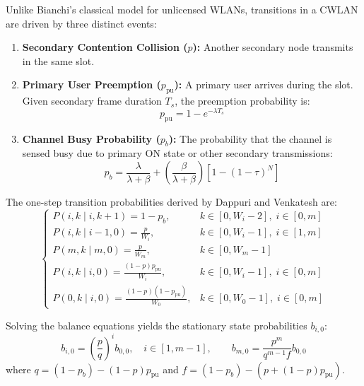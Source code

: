 Unlike Bianchi's classical model for unlicensed WLANs, transitions in a CWLAN are driven by three distinct events:
\begin{enumerate}
    \item \textbf{Secondary Contention Collision ($p$):} Another secondary node transmits in the same slot.
    \item \textbf{Primary User Preemption ($p_{\mathrm{pu}}$):} A primary user arrives during the slot. Given secondary frame duration $T_s$, the preemption probability is:
    \begin{equation}
        p_{\mathrm{pu}} = 1 - e^{-\lambda T_s}
    \end{equation}
    \item \textbf{Channel Busy Probability ($p_b$):} The probability that the channel is sensed busy due to primary ON state or other secondary transmissions:
    \begin{equation}
        p_b = \frac{\lambda}{\lambda + \beta} + \left( \frac{\beta}{\lambda + \beta} \right) \left[ 1 - (1 - \tau)^N \right]
    \end{equation}
\end{enumerate}

The one-step transition probabilities derived by Dappuri and Venkatesh \cite{dappuri2018cognitive} are:
\begin{equation}
    \begin{cases}
        P(i, k \mid i, k + 1) = 1 - p_b, & k \in [0, W_i - 2], \; i \in [0, m] \\
        P(i, k \mid i - 1, 0) = \frac{p}{W_i}, & k \in [0, W_i - 1], \; i \in [1, m] \\
        P(m, k \mid m, 0) = \frac{p}{W_m}, & k \in [0, W_m - 1] \\
        P(i, k \mid i, 0) = \frac{(1 - p) p_{\mathrm{pu}}}{W_i}, & k \in [0, W_i - 1], \; i \in [0, m] \\
        P(0, k \mid i, 0) = \frac{(1 - p)(1 - p_{\mathrm{pu}})}{W_0}, & k \in [0, W_0 - 1], \; i \in [0, m]
    \end{cases}
\end{equation}

Solving the balance equations yields the stationary state probabilities $b_{i, 0}$:
\begin{equation}
    b_{i, 0} = \left( \frac{p}{q} \right)^i b_{0, 0}, \quad i \in [1, m - 1], \qquad b_{m, 0} = \frac{p^m}{q^{m-1} f} b_{0, 0}
\end{equation}
where $q = (1 - p_b) - (1 - p) p_{\mathrm{pu}}$ and $f = (1 - p_b) - (p + (1 - p) p_{\mathrm{pu}})$.

